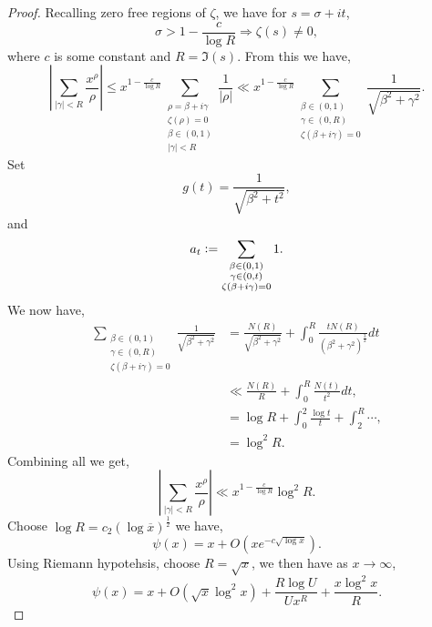 \documentclass{article}
\newcommand{\defeq}{\vcentcolon=}
\begin{document}
\begin{proof}
  Recalling zero free regions of $\zeta$, we have for $s=\sigma+it$, 
  \begin{equation*}
    \sigma>1-{\frac c {\log R}}\Rightarrow\zeta(s) \not=0,
  \end{equation*}
  where $c$ is some constant and $R=\Im(s)$. From this we have,
  \begin{equation*}
    \left\vert\sum_{\vert\gamma\vert<R}{\frac {x^\rho} {\rho}}\right\vert \leq x^{1-{\frac {c} {\log R}}}\sum_{\substack{\rho=\beta+i\gamma\\\zeta(\rho)=0\\\beta\in(0,1)\\\vert\gamma\vert<R}}{\frac 1 {\vert \rho\vert}}\ll x^{1-{\frac c {\log R}}}\sum_{\substack{\beta\in(0,1)\\\gamma\in(0,R)\\\zeta(\beta+i\gamma)=0}}{\frac 1 {\sqrt{\beta^2+\gamma^2}}}.
  \end{equation*}
  Set 
  \begin{equation*}
    g(t) = {\frac {1} {\sqrt{\beta^2+t^2}}},
  \end{equation*}
  and 
  \begin{equation*}
    a_t\defeq \sum_{\substack{\beta\in(0,1)\\\gamma\in(0,t)\\\zeta(\beta+i\gamma)=0}}1.
  \end{equation*}
  We now have,
  \begin{align*}
    \sum_{\substack{\beta\in(0,1)\\\gamma\in(0,R)\\\zeta(\beta+i\gamma)=0}}{\frac 1 {\sqrt{\beta^2+\gamma^2}}}& ={\frac {N(R)} {\sqrt{\beta^2+\gamma^2}}}+\int_0^R{\frac {tN(R)} {(\beta^2+\gamma^2)^{{\frac 3 2}}}}dt\\
    & \ll {\frac {N(R)}{R}}+\int_0^R{\frac {N(t)} {t^2}}dt,\\
    & = \log R+\int_0^2{\frac {\log t} {t}}+\int_2^R\cdots,\\
    & = \log^2R.
  \end{align*}
  Combining all we get,
  \begin{equation*}
    \left\vert\sum_{\vert\gamma\vert<R}{\frac {x^\rho}{\rho}}\right\vert\ll x^{1-{\frac c {\log R}}}\log^2R.
  \end{equation*}
  Choose $\log R = c_2(\log\overline{x})^{{\frac 1 2}}$ we have,
  \begin{equation*}
    \psi(x) = x+O(xe^{-c\sqrt{\log x}}).
  \end{equation*}
  Using Riemann hypotehsis, choose $R= \sqrt{x}$, we then have as $x\to\infty$,
  \begin{equation*}
    \psi(x) = x+O(\sqrt{x}\log^2x)+{\frac {R\log U}{Ux^R}}+{\frac {x\log^2 x}{ R}}.
  \end{equation*}
\end{proof}
\end{document}
